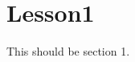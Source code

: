 \documentclass[../main2.tex]{subfiles}
\begin{document}
\section{Lesson1}

This should be section 1.
\end{document}
